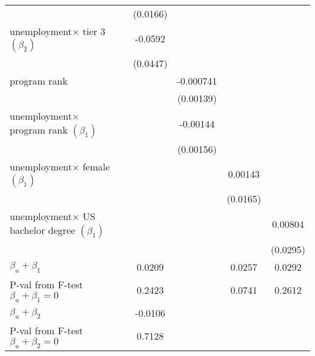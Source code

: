 \begin{table}[htbp]
\begin{adjustbox}{max width=0.59\textwidth}
\begin{tabular}{l*{5}{c}}
            &                     &    (0.0166)         &                     &                     &                     \\
[1em]
unemployment$\times$ tier 3  $\left( \beta_2 \right)$&                     &     -0.0592         &                     &                     &                     \\
            &                     &    (0.0447)         &                     &                     &                     \\
[1em]
program rank       &                     &                     &   -0.000741         &                     &                     \\
            &                     &                     &   (0.00139)         &                     &                     \\
[1em]
unemployment$\times$ program rank $\left( \beta_1 \right)$&                     &                     &    -0.00144         &                     &                     \\
            &                     &                     &   (0.00156)         &                     &                     \\
[1em]
unemployment$\times$ female $\left( \beta_1 \right)$&                     &                     &                     &     0.00143         &                     \\
            &                     &                     &                     &    (0.0165)         &                     \\
[1em]
unemployment$\times$ US bachelor degree $\left( \beta_1 \right)$&                     &                     &                     &                     &     0.00804         \\
            &                     &                     &                     &                     &    (0.0295)         \\
\hline
$\beta_u + \beta_1$ &                 &        0.0209         &     &   0.0257         &       0.0292         \\
P-val from F-test $\beta_u + \beta_1=0$&                 &        0.2423         &     &   0.0741         &       0.2612         \\
$\beta_u + \beta_2$ &                 &        -0.0106         &       &          &                 \\
P-val from F-test $\beta_u + \beta_2=0$&                 &        0.7128         &       &          &                 \\

\end{tabular}
\end{adjustbox}
\end{table}
